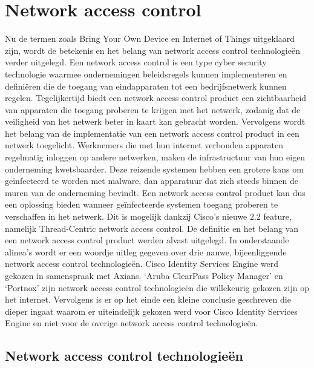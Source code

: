 \section{Network access control}
Nu de termen zoals Bring Your Own Device en Internet of Things uitgeklaard zijn, wordt de betekenis en het belang van network access control technologieën verder uitgelegd.
\newline
\newline 
Een network access control is een type cyber security technologie waarmee ondernemingen beleidsregels kunnen implementeren en definiëren die de toegang van eindapparaten tot een bedrijfsnetwerk kunnen regelen. Tegelijkertijd biedt een network access control product een zichtbaarheid van apparaten die toegang proberen te krijgen met het netwerk, zodanig dat de veiligheid van het netwerk beter in kaart kan gebracht worden. Vervolgens wordt het belang van de implementatie van een network access control product in een netwerk toegelicht.
\newline
\newline 
Werknemers die met hun internet verbonden apparaten regelmatig inloggen op andere netwerken, maken de infrastructuur van hun eigen onderneming kwetsbaarder. Deze reizende systemen hebben een grotere kans om geïnfecteerd te worden met malware, dan apparatuur dat zich steeds binnen de muren van de onderneming bevindt. Een network access control product kan dus een oplossing bieden wanneer geïnfecteerde systemen toegang proberen te verschaffen in het netwerk. Dit is mogelijk dankzij Cisco's nieuwe 2.2 feature, namelijk Thread-Centric network access control. 
\newline
\newline 
De definitie en het belang van een network access control product werden alvast uitgelegd. In onderstaande alinea’s wordt er een woordje uitleg gegeven over drie nauwe, bijeenliggende network access control technologieën. Cisco Identity Services Engine werd gekozen in samenspraak met Axians. ‘Aruba ClearPass Policy Manager’ en ‘Portnox’ zijn network access control technologieën die willekeurig gekozen zijn op het internet. Vervolgens is er op het einde een kleine conclusie geschreven die dieper ingaat waarom er uiteindelijk gekozen werd voor Cisco Identity Services Engine en niet voor de overige network access control technologieën.

\subsection{Network access control technologieën}
